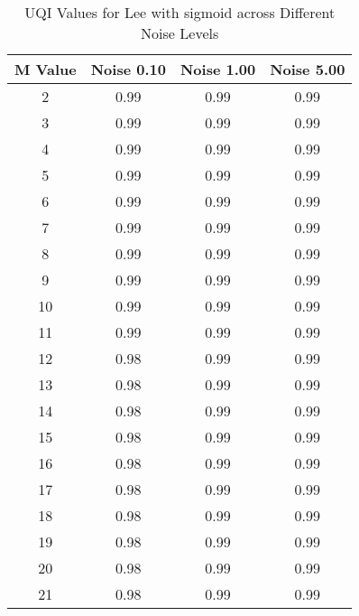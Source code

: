 \begin{table}[htb]
\small
\centering
\begin{tabular}{|c|c|c|c|} \hline
M Value & Noise 0.10 & Noise 1.00 & Noise 5.00 \\ \hline
2 & 0.99 & 0.99 & 0.99 \\ \hline
3 & 0.99 & 0.99 & 0.99 \\ \hline
4 & 0.99 & 0.99 & 0.99 \\ \hline
5 & 0.99 & 0.99 & 0.99 \\ \hline
6 & 0.99 & 0.99 & 0.99 \\ \hline
7 & 0.99 & 0.99 & 0.99 \\ \hline
8 & 0.99 & 0.99 & 0.99 \\ \hline
9 & 0.99 & 0.99 & 0.99 \\ \hline
10 & 0.99 & 0.99 & 0.99 \\ \hline
11 & 0.99 & 0.99 & 0.99 \\ \hline
12 & 0.98 & 0.99 & 0.99 \\ \hline
13 & 0.98 & 0.99 & 0.99 \\ \hline
14 & 0.98 & 0.99 & 0.99 \\ \hline
15 & 0.98 & 0.99 & 0.99 \\ \hline
16 & 0.98 & 0.99 & 0.99 \\ \hline
17 & 0.98 & 0.99 & 0.99 \\ \hline
18 & 0.98 & 0.99 & 0.99 \\ \hline
19 & 0.98 & 0.99 & 0.99 \\ \hline
20 & 0.98 & 0.99 & 0.99 \\ \hline
21 & 0.98 & 0.99 & 0.99 \\ \hline
\end{tabular}
\caption{UQI Values for Lee with sigmoid across Different Noise Levels}
\end{table}

